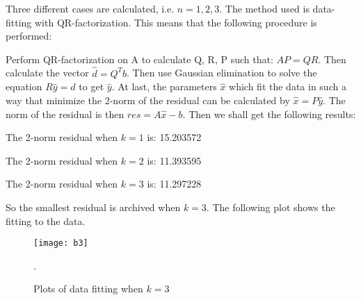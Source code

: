 \documentclass[11pt,a4paper,roman]{scrartcl}
\begin{document}
Three different cases are calculated, i.e. $n = 1,2,3$. The method used is data-fitting with QR-factorization. This means that the following procedure is performed: 

Perform QR-factorization on A to calculate Q, R, P such that: $AP = QR$. Then calculate the vector $\hat{d} = Q^T b$. Then use Gaussian elimination to solve the equation $R \hat{y} = \hat{d}$ to get $\hat{y}$. At last, the parameters $\hat{x}$ which fit the data in such a way that minimize the 2-norm of the residual can be calculated by $\hat{x} = P\hat{y}$. The norm of the residual is then $res = A\hat{x} - b$. Then we shall get the following results: 

The 2-norm residual when $k=1$ is: 15.203572

The 2-norm residual when $k=2$ is: 11.393595

The 2-norm residual when $k=3$ is: 11.297228

So the smallest residual is archived when $k=3$. The following plot shows the fitting to the data. 

\begin{figure}[H]
\centering
\texttt{[image: b3]}
\caption{Plots of data fitting when $k=3$}. 
\end{figure}
\end{document}
